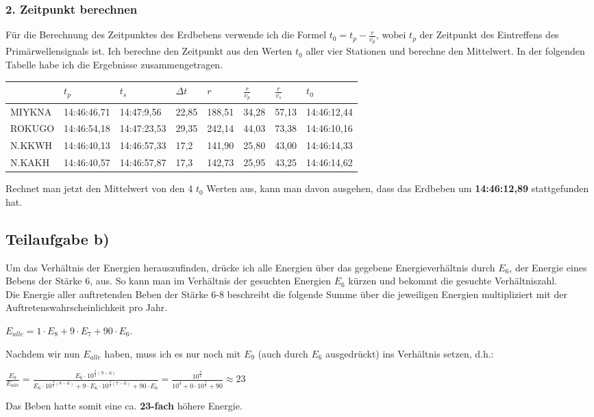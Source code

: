 \documentclass{article}
\begin{document}
\subsubsection*{2. Zeitpunkt berechnen}
Für die Berechnung des Zeitpunktes des Erdbebens verwende ich die Formel 
$t_0 = t_p - \frac{r}{v_p}$, 
wobei $t_p$ der Zeitpunkt des Eintreffens des Primärwellensignals ist. 
Ich berechne den Zeitpunkt aus den Werten $t_0$ aller vier Stationen und berechne den Mittelwert. 
In der folgenden Tabelle habe ich die Ergebnisse zusammengetragen.
\begin{center}
\begin{tabular}{l|l|l|l|l|l|l|l}
		   & $t_{p}$         & $t_s$         & $\Delta t$ & $r$      & $\frac{r}{v_p}$    & $\frac{r}{v_s}$    & $t_0$          \\\hline
	MIYKNA & 14:46:46,71 & 14:47:9,56  & 22,85   & 188,51 & 34,28 & 57,13 & 14:46:12,44 \\
	ROKUGO & 14:46:54,18 & 14:47:23,53 & 29,35   & 242,14 & 44,03 & 73,38 & 14:46:10,16 \\
	N.KKWH & 14:46:40,13 & 14:46:57,33 & 17,2    & 141,90 & 25,80 & 43,00 & 14:46:14,33 \\
	N.KAKH & 14:46:40,57 & 14:46:57,87 & 17,3    & 142,73 & 25,95 & 43,25 & 14:46:14,62 
\end{tabular}
\end{center}
Rechnet man jetzt den Mittelwert von den 4 $t_0$ Werten aus, kann man davon ausgehen, 
dass das Erdbeben um \textbf{14:46:12,89} stattgefunden hat.


\subsection*{Teilaufgabe b)}
Um das Verhältnis der Energien herauszufinden, drücke ich alle Energien über das gegebene Energieverhältnis durch $E_6$, der Energie eines Bebens der Stärke 6, aus. 
So kann man im Verhältnis der gesuchten Energien $E_6$ kürzen und bekommt die gesuchte Verhältniszahl.\\
Die Energie aller auftretenden Beben der Stärke 6-8 beschreibt die folgende Summe über die jeweiligen Energien multipliziert mit der Auftretenswahrscheinlichkeit pro Jahr. 
\begin{center}
$E_{alle} = 1 \cdot E_8 + 9 \cdot E_7 + 90 \cdot E_6$. 
\end{center}
Nachdem wir nun $E_{alle}$ haben, muss ich es nur noch mit $E_9$ (auch durch $E_6$ ausgedrückt) ins Verhältnis setzen, d.h.:
\begin{center}
$\frac{E_9}{E_{alle}} = \frac{E_6 \cdot 10^{\frac{3}{2} (9 - 6)}}{E_6 \cdot 10^{\frac{3}{2}(8-6)} + 9 \cdot E_6 \cdot 10^{\frac{3}{2}(7-6)} + 90 \cdot E_6}
= \frac{10^\frac{9}{2}}{10^3 + 0 \cdot 10^\frac{3}{2} + 90} \approx 23$
\end{center}
Das Beben hatte somit eine ca. \textbf{23-fach} höhere Energie.\\
\end{document}
